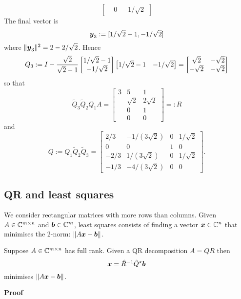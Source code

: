 \begin{example}
\[\begin{bmatrix}
& 0 & -1/\sqrt{2}
\end{bmatrix}
\]
The final vector is 
\[
\bm{{\mbox{\boldmath$y$\unboldmath}}}_3 := [1/\sqrt{2}-1,-1/\sqrt{2}]
\]
where $\| \bm{{\mbox{\boldmath$y$\unboldmath}}}_3 \|^2 = 2 - 2/\sqrt{2}$. Hence
\[
Q_3 := I - {\sqrt{2} \over \sqrt{2} - 1} \begin{bmatrix}
1/\sqrt{2}-1 \\
-1/\sqrt{2}
\end{bmatrix} \begin{bmatrix}
1/\sqrt{2}-1 &
-1/\sqrt{2}
\end{bmatrix} =
\begin{bmatrix}
\sqrt{2} & -\sqrt{2}\\
-\sqrt{2} & -\sqrt{2}
\end{bmatrix}
\]
so that 
\[
\tilde Q_3 \tilde Q_2 Q_1 A = \begin{bmatrix} 3 & 5 & 1 \\
 & \sqrt{2} & 2\sqrt{2} \\
  & 0 & 1 \\
& 0 & 0
\end{bmatrix} =: R
\]
and
\[
Q := Q_1 \tilde Q_2 \tilde Q_3 =  \begin{bmatrix}
2/3 & -1/(3\sqrt{2}) & 0 & 1/\sqrt{2} \\
0 &  0 & 1 & 0 \\
-2/3 & 1/(3\sqrt{2}) & 0 & 1/\sqrt{2} \\ 
-1/3 & - 4/(3\sqrt{2}) & 0 & 0
\end{bmatrix}.
\]
\subsection{QR and least squares}
We consider rectangular matrices with more rows than columns. Given $A \in {\mathbb C}^{m \times n}$ and $\bm{{\mbox{\boldmath$b$\unboldmath}}} \in {\mathbb C}^m$, least squares consists of finding a vector $\bm{{\mbox{\boldmath$x$\unboldmath}}} \in {\mathbb C}^n$ that minimises the 2-norm: $\| A \bm{{\mbox{\boldmath$x$\unboldmath}}} - \bm{{\mbox{\boldmath$b$\unboldmath}}} \|$.

\begin{theorem} Suppose $A \in {\mathbb C}^{m \times n}$ has full rank. Given a QR decomposition $A = Q R$ then
\[
\bm{{\mbox{\boldmath$x$\unboldmath}}} = \hat R^{-1} \hat Q^\star \bm{{\mbox{\boldmath$b$\unboldmath}}}
\]
minimises $\| A \bm{{\mbox{\boldmath$x$\unboldmath}}} - \bm{{\mbox{\boldmath$b$\unboldmath}}} \|$. 

\end{theorem}
\textbf{Proof}


\end{example}

